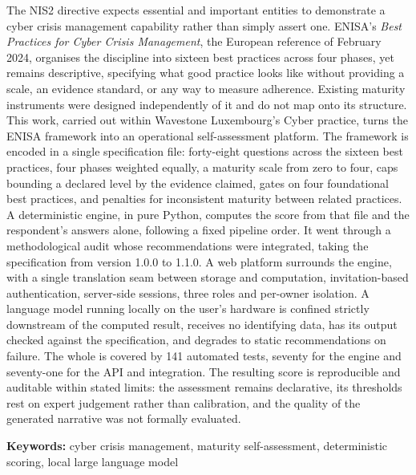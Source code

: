 \documentclass[english]{tnreport}
\begin{document}
The NIS2 directive expects essential and important entities to demonstrate a
cyber crisis management capability rather than simply assert one. ENISA's
\emph{Best Practices for Cyber Crisis Management}, the European reference of
February 2024, organises the discipline into sixteen best practices across four
phases, yet remains descriptive, specifying what good practice looks like
without providing a scale, an evidence standard, or any way to measure
adherence. Existing maturity instruments were designed independently of it and
do not map onto its structure. This work, carried out within Wavestone
Luxembourg's Cyber practice, turns the ENISA framework into an operational
self-assessment platform. The framework is encoded in a single specification
file: forty-eight questions across the sixteen best practices, four phases
weighted equally, a maturity scale from zero to four, caps bounding a declared
level by the evidence claimed, gates on four foundational best practices, and
penalties for inconsistent maturity between related practices. A deterministic
engine, in pure Python, computes the score from that file and the respondent's
answers alone, following a fixed pipeline order. It went through a
methodological audit whose recommendations were integrated, taking the
specification from version 1.0.0 to 1.1.0. A web platform surrounds the engine,
with a single translation seam between storage and computation,
invitation-based authentication, server-side sessions, three roles and
per-owner isolation. A language model running locally on the user's hardware is
confined strictly downstream of the computed result, receives no identifying
data, has its output checked against the specification, and degrades to static
recommendations on failure. The whole is covered by 141 automated tests,
seventy for the engine and seventy-one for the API and integration. The
resulting score is reproducible and auditable within stated limits: the
assessment remains declarative, its thresholds rest on expert judgement rather
than calibration, and the quality of the generated narrative was not formally
evaluated.

  {\bf Keywords:} cyber crisis management, maturity self-assessment,
  deterministic scoring, local large language model

\printSignatures
\end{document}

